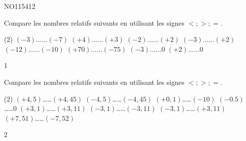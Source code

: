 \documentclass[a4paper,11pt]{report}
\begin{document}
\begin{exof}{NO115}{41}{2}
\end{exof}
\begin{exop}
{Compare les nombres relatifs suivants en utilisant les signes $< ; > ; =$. 
\begin{tasks}[after-item-skip=0.2em](2)	
    \task $(-3)\ldots\ldots (-7)$
    \task $(+4)\ldots\ldots (+3)$
    \task $(-2)\ldots\ldots (+2)$
    \task $(-3)\ldots\ldots (+2)$
    \task $(-12)\ldots\ldots (-10)$
    \task $(+70)\ldots\ldots (-75)$
    \task $(-3)\ldots\ldots 0$
    \task $(+2)\ldots\ldots 0$
\end{tasks}
}
{1}
\end{exop}


\begin{exop}
{Compare les nombres relatifs suivants en utilisant les signes $< ; > ; =$.
	\begin{tasks}[after-item-skip=0.3em](2)	
    \task $(+4,5)$\ldots\ldots $(+4,45)$
    \task $(-4,5)$\ldots\ldots $(-4,45)$
    \task $(+0,1)$\ldots\ldots $(-10)$
    \task $(-0.5)$\ldots\ldots $0$
    \task $(+3,1)$\ldots\ldots $(+3,11)$
    \task $(-3,1)$\ldots\ldots $(-3,11)$
    \task $(-3,1)$\ldots\ldots $(+3,11)$
    \task $(+7,51)$\ldots\ldots $(-7,52)$
\end{tasks}
}
{2}
\end{exop}


%
%
\end{document}
